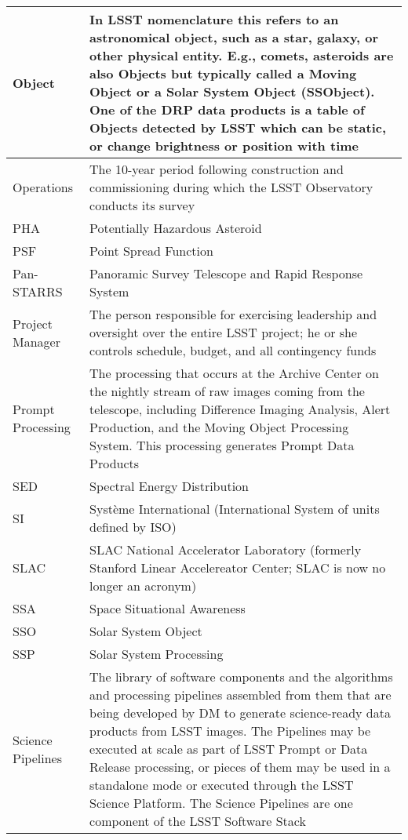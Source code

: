 \begin{longtable}{|p{}|p{}|}
Object & In \gls{LSST} nomenclature this refers to an \gls{astronomical object}, such as a star, galaxy, or other physical entity. E.g., comets, asteroids are also Objects but typically called a Moving Object or a \gls{Solar System Object} (SSObject). One of the \gls{DRP} data products is a table of Objects detected by \gls{LSST} which can be static, or change brightness or position with time \\\hline
Operations & The 10-year period following construction and commissioning during which the \gls{LSST} Observatory conducts its survey \\\hline
PHA & Potentially Hazardous Asteroid \\\hline
PSF & Point Spread Function \\\hline
Pan-STARRS & Panoramic Survey Telescope and Rapid Response System \\\hline
Project Manager & The person responsible for exercising leadership and oversight over the entire \gls{LSST} project; he or she controls schedule, budget, and all contingency funds \\\hline
Prompt Processing & The processing that occurs at the \gls{Archive} \gls{Center} on the nightly stream of raw images coming from the telescope, including Difference Imaging Analysis, \gls{Alert} Production, and the \gls{Moving Object Processing System}. This processing generates Prompt Data Products \\\hline
SED & \gls{Spectral Energy Distribution} \\\hline
SI & Syst\`eme International (International System of units defined by ISO) \\\hline
SLAC & \gls{SLAC} National Accelerator Laboratory (formerly Stanford Linear Accelereator \gls{Center}; \gls{SLAC} is now no longer an acronym) \\\hline
SSA & Space Situational Awareness \\\hline
SSO & \gls{Solar System Object} \\\hline
SSP & Solar System Processing \\\hline
Science Pipelines & The library of software components and the algorithms and processing pipelines assembled from them that are being developed by \gls{DM} to generate science-ready data products from \gls{LSST} images. The Pipelines may be executed at scale as part of \gls{LSST} Prompt or \gls{Data Release} processing, or pieces of them may be used in a standalone mode or executed through the \gls{LSST} \gls{Science Platform}. The \gls{Science Pipelines} are one component of the \gls{LSST} \gls{Software Stack} \\\hline

\end{longtable}
